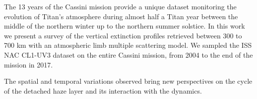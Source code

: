 The 13 years of the Cassini mission provide a unique dataset monitoring
the evolution of Titan’s atmosphere during almost half a Titan year
between the middle of the northern winter up to the northern summer solstice.
In this work we present a survey of the vertical extinction profiles retrieved
between 300 to 700 km with an atmospheric limb multiple scattering model.
We sampled the ISS NAC CL1-UV3 dataset on the entire Cassini mission,
from 2004 to the end of the mission in 2017.

The spatial and temporal variations observed bring new perspectives
on the cycle of the detached haze layer and its interaction with the dynamics.